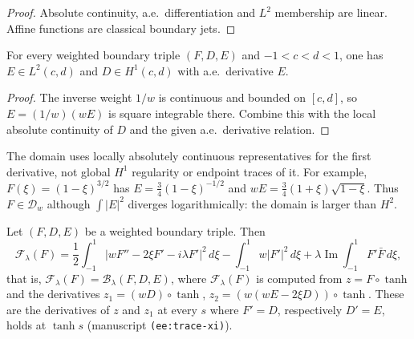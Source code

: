 \begin{proof}
\leanok
Absolute continuity, a.e.\ differentiation and $L^2$ membership are linear.
Affine functions are classical boundary jets.
\end{proof}

\begin{lemma}
\label{lem:weighted-boundary-local}
\leanok
For every weighted boundary triple $(F,D,E)$ and $-1<c<d<1$, one has
$E\in L^2(c,d)$ and $D\in H^1(c,d)$ with a.e.\ derivative $E$.
\end{lemma}

\begin{proof}
\leanok
The inverse weight $1/w$ is continuous and bounded on $[c,d]$, so
$E=(1/w)(wE)$ is square integrable there. Combine this with the local
absolute continuity of $D$ and the given a.e.\ derivative relation.
\end{proof}

\begin{remark}
The domain uses locally absolutely continuous representatives for the
first derivative, not global $H^1$ regularity or endpoint traces of it.
For example, $F(\xi)=(1-\xi)^{3/2}$ has
$E=\tfrac34(1-\xi)^{-1/2}$ and
$wE=\tfrac34(1+\xi)\sqrt{1-\xi}$. Thus $F\in\mathcal D_w$ although
$\int|E|^2$ diverges logarithmically: the domain is larger than $H^2$.
\end{remark}

\begin{lemma}
\label{lem:boundary-form-xi}
\leanok
Let $(F,D,E)$ be a weighted boundary triple. Then
\[
  \mathcal F_\lambda(F)=\frac12\int_{-1}^1|wF''-2\xi F'-i\lambda F'|^2\,d\xi
  -\int_{-1}^1w|F'|^2\,d\xi+\lambda\operatorname{Im}\int_{-1}^1F'\bar F\,d\xi ,
\]
that is, $\mathcal F_\lambda(F)=\mathcal B_\lambda(F,D,E)$, where
$\mathcal F_\lambda(F)$ is computed from $z=F\circ\tanh$ and the derivatives
$z_1=(wD)\circ\tanh$, $z_2=(w(wE-2\xi D))\circ\tanh$. These are the derivatives
of $z$ and $z_1$ at every $s$ where $F'=D$, respectively $D'=E$, holds at
$\tanh s$ (manuscript \texttt{(ee:trace-xi)}).
\end{lemma}

